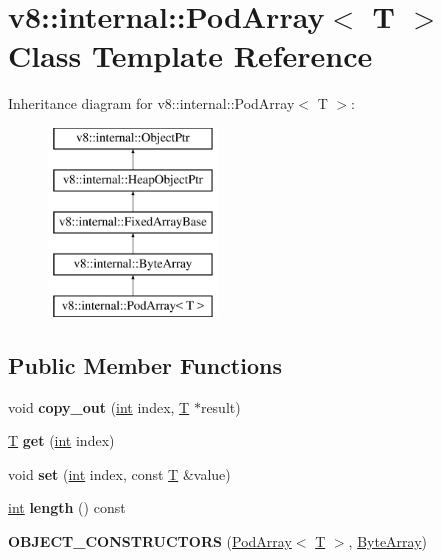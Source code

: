 \hypertarget{classv8_1_1internal_1_1PodArray}{}\section{v8\+:\+:internal\+:\+:Pod\+Array$<$ T $>$ Class Template Reference}
\label{classv8_1_1internal_1_1PodArray}
Inheritance diagram for v8\+:\+:internal\+:\+:Pod\+Array$<$ T $>$\+:\begin{figure}[H]
\begin{center}
\leavevmode
\includegraphics[height=5.000000cm]{classv8_1_1internal_1_1PodArray}
\end{center}
\end{figure}
\subsection*{Public Member Functions}
\begin{DoxyCompactItemize}
\item 
\mbox{\label{classv8_1_1internal_1_1PodArray_a02fce815d6186a1399572fa628a2fb4d}} 
void {\bfseries copy\+\_\+out} (\mbox{\hyperlink{classint}{int}} index, \mbox{\hyperlink{classv8_1_1internal_1_1torque_1_1T}{T}} $\ast$result)
\item 
\mbox{\label{classv8_1_1internal_1_1PodArray_a29460a072c7a9033687c695cd110ff47}} 
\mbox{\hyperlink{classv8_1_1internal_1_1torque_1_1T}{T}} {\bfseries get} (\mbox{\hyperlink{classint}{int}} index)
\item 
\mbox{\label{classv8_1_1internal_1_1PodArray_a1d69a5b741911759052d77eae8461d90}} 
void {\bfseries set} (\mbox{\hyperlink{classint}{int}} index, const \mbox{\hyperlink{classv8_1_1internal_1_1torque_1_1T}{T}} \&value)
\item 
\mbox{\label{classv8_1_1internal_1_1PodArray_a009942ffae5b1173980f45fa78dc0091}} 
\mbox{\hyperlink{classint}{int}} {\bfseries length} () const
\item 
\mbox{\label{classv8_1_1internal_1_1PodArray_a9d5f46e469fd10a2410589d1c80693ad}} 
{\bfseries O\+B\+J\+E\+C\+T\+\_\+\+C\+O\+N\+S\+T\+R\+U\+C\+T\+O\+RS} (\mbox{\hyperlink{classv8_1_1internal_1_1PodArray}{Pod\+Array}}$<$ \mbox{\hyperlink{classv8_1_1internal_1_1torque_1_1T}{T}} $>$, \mbox{\hyperlink{classv8_1_1internal_1_1ByteArray}{Byte\+Array}})
\end{DoxyCompactItemize}
